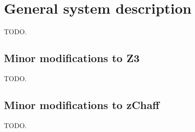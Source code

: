 \section{General system description}

TODO.

\subsection{Minor modifications to Z3}

TODO.

\subsection{Minor modifications to zChaff}

TODO.

